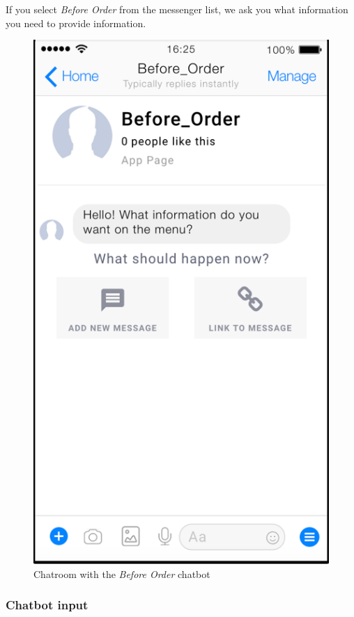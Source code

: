 If you select \emph{Before Order} from the messenger list, we ask you what information you need to provide information.

\begin{figure}[htbp]
\centerline{\includegraphics[width=\linewidth]{./pictures/facebook_message}}
\caption{Chatroom with the \emph{Before Order} chatbot}
\label{fig:facebook_message}
\end{figure}
\FloatBarrier

\subsubsection{Chatbot input}

